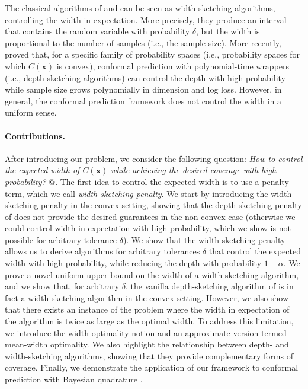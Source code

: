 \documentclass{article} %
\theoremstyle{remark}
\theoremstyle{definition}      %
\begin{document}
The classical algorithms of \cite{guttman1970statistical} and \cite{tukey1947nonparametric,tukey1948nonparametric} can be seen as width-sketching algorithms, controlling the width in expectation. More precisely, they produce an interval that contains the random variable with probability $\delta$, but the width is proportional to the number of samples (i.e., the sample size). More recently, \cite{barber2021limits} proved that, for a specific family of probability spaces (i.e., probability spaces for which $C(\bm{x})$ is convex), conformal prediction with polynomial-time wrappers (i.e., depth-sketching algorithms) can control the depth with high probability while sample size grows polynomially in dimension and log loss. However, in general, the conformal prediction framework does not control the width in a uniform sense.

\paragraph{Contributions.} After introducing our problem, we consider the following question:
\emph{How to control the expected width of $C(\bm{x})$ while achieving the desired coverage with high probability?} 
@. 
The first idea to control the expected width is to use a penalty term, which we call \emph{width-sketching penalty}. We start by introducing the width-sketching penalty in the convex setting, showing that the depth-sketching penalty of \cite{angelopoulos2024conformal} does not provide the desired guarantees in the non-convex case (otherwise we could control width in expectation with high probability, which we show is not possible for arbitrary tolerance $\delta$). We show that the width-sketching penalty allows us to derive algorithms for arbitrary tolerances $\delta$ that control the expected width with high probability, while reducing the depth with probability $1-\alpha$. We prove a novel uniform upper bound on the width of a width-sketching algorithm, and we show that, for arbitrary $\delta$, the vanilla depth-sketching algorithm of \cite{angelopoulos2024conformal} is in fact a width-sketching algorithm in the convex setting. However, we also show that there exists an instance of the problem where the width in expectation of the algorithm is twice as large as the optimal width. To address this limitation, we introduce the width-optimality notion and an approximate version termed mean-width optimality. We also highlight the relationship between depth- and width-sketching algorithms, showing that they provide complementary forms of coverage. Finally, we demonstrate the application of our framework to conformal prediction with Bayesian quadrature \citep[see, e.g.,][and many other works that follow]{diaconis1988bayesian, karvonen2017classical,cockayne2019bayesian,hennig2022probabilistic,hobbhahn2022fast}.
\end{document}

